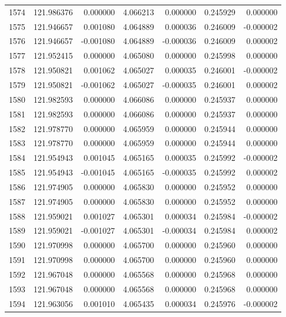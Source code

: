 \begin{tabular}{rrrrrrr}
1574 & 121.986376 &    0.000000 &  4.066213 &    0.000000 &    0.245929 &  0.000000 \\
1575 & 121.946657 &    0.001080 &  4.064889 &    0.000036 &    0.246009 & -0.000002 \\
1576 & 121.946657 &   -0.001080 &  4.064889 &   -0.000036 &    0.246009 &  0.000002 \\
1577 & 121.952415 &    0.000000 &  4.065080 &    0.000000 &    0.245998 &  0.000000 \\
1578 & 121.950821 &    0.001062 &  4.065027 &    0.000035 &    0.246001 & -0.000002 \\
1579 & 121.950821 &   -0.001062 &  4.065027 &   -0.000035 &    0.246001 &  0.000002 \\
1580 & 121.982593 &    0.000000 &  4.066086 &    0.000000 &    0.245937 &  0.000000 \\
1581 & 121.982593 &    0.000000 &  4.066086 &    0.000000 &    0.245937 &  0.000000 \\
1582 & 121.978770 &    0.000000 &  4.065959 &    0.000000 &    0.245944 &  0.000000 \\
1583 & 121.978770 &    0.000000 &  4.065959 &    0.000000 &    0.245944 &  0.000000 \\
1584 & 121.954943 &    0.001045 &  4.065165 &    0.000035 &    0.245992 & -0.000002 \\
1585 & 121.954943 &   -0.001045 &  4.065165 &   -0.000035 &    0.245992 &  0.000002 \\
1586 & 121.974905 &    0.000000 &  4.065830 &    0.000000 &    0.245952 &  0.000000 \\
1587 & 121.974905 &    0.000000 &  4.065830 &    0.000000 &    0.245952 &  0.000000 \\
1588 & 121.959021 &    0.001027 &  4.065301 &    0.000034 &    0.245984 & -0.000002 \\
1589 & 121.959021 &   -0.001027 &  4.065301 &   -0.000034 &    0.245984 &  0.000002 \\
1590 & 121.970998 &    0.000000 &  4.065700 &    0.000000 &    0.245960 &  0.000000 \\
1591 & 121.970998 &    0.000000 &  4.065700 &    0.000000 &    0.245960 &  0.000000 \\
1592 & 121.967048 &    0.000000 &  4.065568 &    0.000000 &    0.245968 &  0.000000 \\
1593 & 121.967048 &    0.000000 &  4.065568 &    0.000000 &    0.245968 &  0.000000 \\
1594 & 121.963056 &    0.001010 &  4.065435 &    0.000034 &    0.245976 & -0.000002 \\

\end{tabular}
